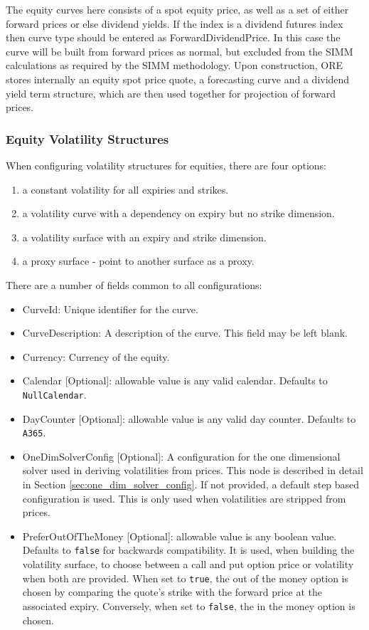\documentclass[12pt, a4paper]{article}
\begin{document}
{{The equity curves here consists of a spot equity price, as well as a set of either forward prices or else dividend 
yields. If the index is a dividend futures index then curve type should be entered as ForwardDividendPrice. In this case the curve will be built from forward prices as normal, but excluded from the SIMM calculations as required by the SIMM methodology.
Upon construction, ORE stores internally an equity spot price quote, a forecasting curve and a dividend yield 
term structure, which are then used together for projection of forward prices.

\subsubsection{Equity Volatility Structures}

When configuring volatility structures for equities, there are four options:
\begin{enumerate}
\item a constant volatility for all expiries and strikes.
\item a volatility curve with a dependency on expiry but no strike dimension.
\item a volatility surface with an expiry and strike dimension.
\item a proxy surface - point to another surface as a proxy.
\end{enumerate}

There are a number of fields common to all configurations:
\begin{itemize}
\item CurveId: Unique identifier for the curve.
\item CurveDescription: A description of the curve. This field may be left blank.
\item Currency: Currency of the equity.
\item Calendar [Optional]: allowable value is any valid calendar. Defaults to \lstinline!NullCalendar!.
\item DayCounter [Optional]: allowable value is any valid day counter. Defaults to \lstinline!A365!.
\item OneDimSolverConfig [Optional]: A configuration for the one dimensional solver used in deriving volatilities from prices. This node is described in detail in Section \ref{sec:one_dim_solver_config}. If not provided, a default step based configuration is used. This is only used when volatilities are stripped from prices.
\item PreferOutOfTheMoney [Optional]: allowable value is any boolean value. Defaults to \lstinline!false! for backwards compatibility. It is used, when building the volatility surface, to choose between a call and put option price or volatility when both are provided. When set to \lstinline!true!, the out of the money option is chosen by comparing the quote's strike with the forward price at the associated expiry. Conversely, when set to \lstinline!false!, the in the money option is chosen.
\end{itemize}

}}
\end{document}
